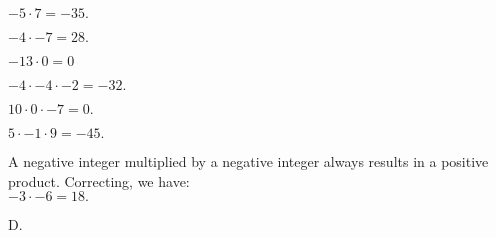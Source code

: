 \documentclass[12pt]{article}
\newenvironment{problem}[2][Problem]{\begin{trivlist}
\item[\hskip \labelsep {\bfseries #1}\hskip \labelsep {\bfseries #2.}]}{\end{trivlist}}
\begin{document}
\begin{problem}{14}
$-5 \cdot 7 = \boxed{-35.}$
\end{problem}

\begin{problem}{15}
$-4 \cdot -7 = \boxed{28.}$
\end{problem}

\begin{problem}{16}
$-13 \cdot 0 = \boxed{0}$
\end{problem}

\begin{problem}{17}
$-4 \cdot -4 \cdot -2 = \boxed{-32.}$
\end{problem}

\begin{problem}{18}
$10 \cdot 0 \cdot -7 = \boxed{0.}$
\end{problem}

\begin{problem}{19}
$5 \cdot -1 \cdot 9 = \boxed{-45.}$
\end{problem}

\begin{problem}{20}
A negative integer multiplied by a negative integer always results in a positive product. Correcting, we have: \\ 
$-3 \cdot -6 = \boxed{18.}$
\end{problem}

\begin{problem}{21}
D.
\end{problem}
\end{document}
